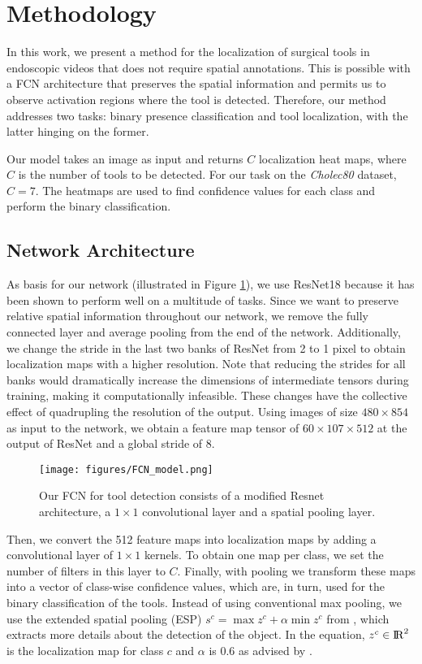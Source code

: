 \documentclass[english,runningheads,a4paper]{llncs}
\begin{document}
\section{Methodology}
In this work, we present a method for the localization of surgical tools in endoscopic videos that does not require spatial annotations. This is possible with a FCN architecture that preserves the spatial information and permits us to observe activation regions where the tool is detected. Therefore, our method addresses two tasks: binary presence classification and tool localization, with the latter hinging on the former.

Our model takes an image as input and returns $C$ localization heat maps, where $C$ is the number of tools to be detected. For our task on the \textit{Cholec80} dataset, $C=7$. The heatmaps are used to find confidence values for each class and perform the binary classification.

\subsection{Network Architecture}
As basis for our network (illustrated in Figure \ref{fig:model_fcn}), we use ResNet18 \cite{he:cvpr16} because it has been shown to perform well on a multitude of tasks. 
Since we want to preserve relative spatial information throughout our network, we remove the fully connected layer and average pooling from the end of the network. 
Additionally, we change the stride in the last two banks of ResNet from 2 to 1 pixel to obtain localization maps with a higher resolution. Note that reducing the strides for all banks would dramatically increase the dimensions of intermediate tensors during training, making it computationally infeasible.
These changes have the collective effect of quadrupling the resolution of the output. 
Using images of size $480 \times 854$ as input to the network, we obtain a feature map tensor of $60 \times 107 \times 512$ at the output of ResNet and a global stride of 8.

\begin{figure}[t]
    \centering
    \texttt{[image: figures/FCN\_model.png]}
    \caption{Our FCN for tool detection consists of a modified Resnet architecture, a $1\times 1$ convolutional layer and a spatial pooling layer.}
    \label{fig:model_fcn}
\end{figure}

Then, we convert the 512 feature maps into localization maps by adding a convolutional layer of $1 \times 1$ kernels. 
To obtain one map per class, we set the number of filters in this layer to $C$.
Finally, with pooling we transform these maps into a vector of class-wise confidence values, which are, in turn, used for the binary classification of the tools. 
Instead of using conventional max pooling, we use the extended spatial pooling (ESP) $s^c=\max z^c + \alpha \min z^c$ from \cite{durand:cvpr17}, which extracts more details about the detection of the object.
In the equation, $z^c\in  {\rm I\!R}^2$ is the localization map for class $c$ and $\alpha$ is 0.6 as advised by \cite{durand:cvpr17}.
\end{document}
